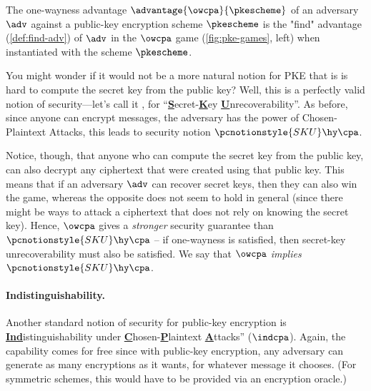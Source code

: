         \begin{definition}[OW-CPA]\label{def:owcpa}
          The one-wayness advantage $\advantage{\owcpa}{\pkescheme}$ of an
          adversary $\adv$ against a public-key encryption scheme $\pkescheme$
          is the "find" advantage (\cref{def:find-adv}) of $\adv$ in the
          $\owcpa$ game (\cref{fig:pke-games}, left) when instantiated with the
          scheme $\pkescheme$.
        \end{definition}

        \newcommand{\skucpa}{\pcnotionstyle{SKU}\hy\cpa}
        You might wonder if it would not be a more natural notion
          for PKE that is is hard to compute the secret key from the public key? 
          Well, this is a perfectly valid notion of security---let's call
          it , for ``\textbf{\underline{S}}ecret-\textbf{\underline{K}}ey \textbf{\underline{U}}nrecoverability''. 
          As before, since anyone can encrypt messages, 
          the adversary has the power of Chosen-Plaintext Attacks, this leads to security notion $\skucpa$.

        Notice, though, that anyone who can compute the secret key from the public
          key, can also decrypt any ciphertext that were created using that public
          key. This means that if an adversary $\adv$ can recover secret keys,
          then they can also win the \owcpa game, whereas
          the opposite does not seem to hold in general (since there might be
          ways to attack a ciphertext that does not rely on knowing the secret
          key). Hence, $\owcpa$ gives a \emph{stronger} security guarantee than
          $\skucpa$ -- if one-wayness is satisfied, then 
          secret-key unrecoverability must also be satisfied.
          We say that $\owcpa$ \emph{implies} $\skucpa$.

        
    \paragraph{Indistinguishability.}

      Another standard notion of security for public-key encryption is 
        \textbf{\underline{Ind}}istinguishability under \textbf{\underline{C}}hosen-\textbf{\underline{P}}laintext \textbf{\underline{A}}ttacks'' ($\indcpa$).
        Again, the  capability comes for free since
        with public-key encryption, any adversary can generate as many
        encryptions as it wants, for whatever message it chooses.
        (For symmetric schemes, this would
        have to be provided via an encryption oracle.)

